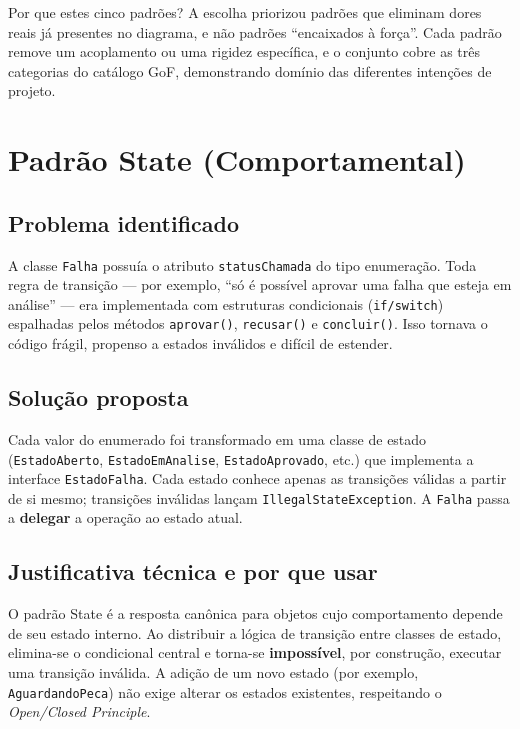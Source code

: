 \documentclass[10pt]{article}
\begin{document}
\begin{destaque}{Por que estes cinco padrões?}
A escolha priorizou padrões que eliminam dores reais já presentes no diagrama,
e não padrões ``encaixados à força''. Cada padrão remove um acoplamento ou uma
rigidez específica, e o conjunto cobre as três categorias do catálogo GoF,
demonstrando domínio das diferentes intenções de projeto.
\end{destaque}

\newpage

\section{Padrão State (Comportamental)}

\subsection{Problema identificado}
A classe \texttt{Falha} possuía o atributo \texttt{statusChamada} do tipo
enumeração. Toda regra de transição --- por exemplo, ``só é possível aprovar uma
falha que esteja em análise'' --- era implementada com estruturas
condicionais (\texttt{if/switch}) espalhadas pelos métodos \texttt{aprovar()},
\texttt{recusar()} e \texttt{concluir()}. Isso tornava o código frágil,
propenso a estados inválidos e difícil de estender.

\subsection{Solução proposta}
Cada valor do enumerado foi transformado em uma classe de estado
(\texttt{EstadoAberto}, \texttt{EstadoEmAnalise}, \texttt{EstadoAprovado}, etc.)
que implementa a interface \texttt{EstadoFalha}. Cada estado conhece apenas as
transições válidas a partir de si mesmo; transições inválidas lançam
\texttt{IllegalStateException}. A \texttt{Falha} passa a \textbf{delegar} a
operação ao estado atual.

\subsection{Justificativa técnica e por que usar}
O padrão State é a resposta canônica para objetos cujo comportamento depende de
seu estado interno. Ao distribuir a lógica de transição entre classes de estado,
elimina-se o condicional central e torna-se \textbf{impossível}, por
construção, executar uma transição inválida. A adição de um novo estado (por
exemplo, \texttt{AguardandoPeca}) não exige alterar os estados existentes,
respeitando o \textit{Open/Closed Principle}.
\end{document}
